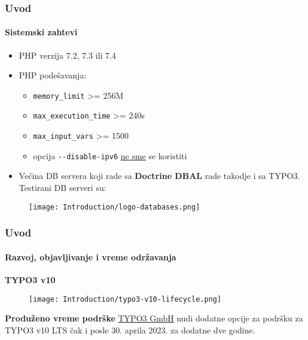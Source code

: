 
\begin{frame}[fragile]
	\frametitle{Uvod}
	\framesubtitle{Sistemski zahtevi}

	\begin{itemize}
		\item PHP verzija 7.2, 7.3 ili 7.4
		\item PHP podešavanja:

			\begin{itemize}
				\item \texttt{memory\_limit} >= 256M
				\item \texttt{max\_execution\_time} >= 240s
				\item \texttt{max\_input\_vars} >= 1500
				\item opcija \texttt{-}\texttt{-disable-ipv6} \underline{ne sme} se koristiti
			\end{itemize}

		\item Većina DB servera koji rade sa \textbf{Doctrine DBAL} rade takodje i sa TYPO3.
			Testirani DB serveri su:
	\end{itemize}

	\begin{figure}
		\texttt{[image: Introduction/logo-databases.png]}
	\end{figure}

\end{frame}


\begin{frame}[fragile]
	\frametitle{Uvod}
	\framesubtitle{Razvoj, objavljivanje i vreme održavanja}

	\textbf{TYPO3 v10}

	\begin{figure}
		\texttt{[image: Introduction/typo3-v10-lifecycle.png]}
	\end{figure}

	\textbf{Produženo vreme podrške}\newline
	\smaller
		\href{https://typo3.com}{TYPO3 GmbH} nudi dodatne opcije za podršku za
		TYPO3 v10 LTS čak i posle 30. aprila 2023. za dodatne dve godine.
	\normalsize

\end{frame}

